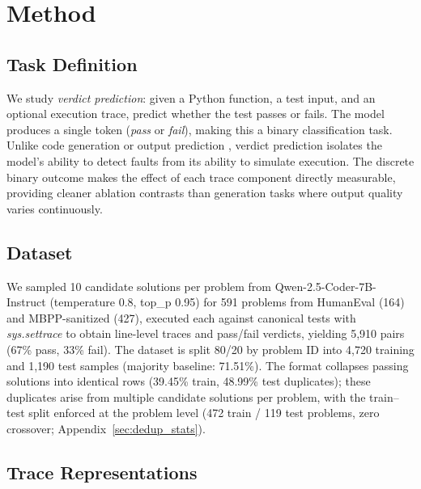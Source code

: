 \section{Method}

\subsection{Task Definition}

We study \emph{verdict prediction}: given a Python function, a test input, and an optional execution trace, predict whether the test passes or fails.
The model produces a single token (\textit{pass} or \textit{fail}), making this a binary classification task.
Unlike code generation \citep{chen2025tracepile} or output prediction \citep{gu2024cruxeval}, verdict prediction isolates the model's ability to detect faults from its ability to simulate execution.
The discrete binary outcome makes the effect of each trace component directly measurable, providing cleaner ablation contrasts than generation tasks where output quality varies continuously.

\subsection{Dataset}
\label{sec:dataset}

We sampled 10 candidate solutions per problem from Qwen-2.5-Coder-7B-Instruct (temperature 0.8, top\_p 0.95) for 591 problems from HumanEval \citep{chen2021evaluating} (164) and MBPP-sanitized \citep{austin2021program} (427), executed each against canonical tests with \textit{sys.settrace} to obtain line-level traces and pass/fail verdicts, yielding 5,910 pairs (67\% pass, 33\% fail).
The dataset is split 80/20 by problem ID into 4,720 training and 1,190 test samples (majority baseline: 71.51\%).
The  format collapses passing solutions into identical rows (39.45\% train, 48.99\% test duplicates); these duplicates arise from multiple candidate solutions per problem, with the train--test split enforced at the problem level (472 train / 119 test problems, zero crossover; Appendix~\ref{sec:dedup_stats}).

\subsection{Trace Representations}


